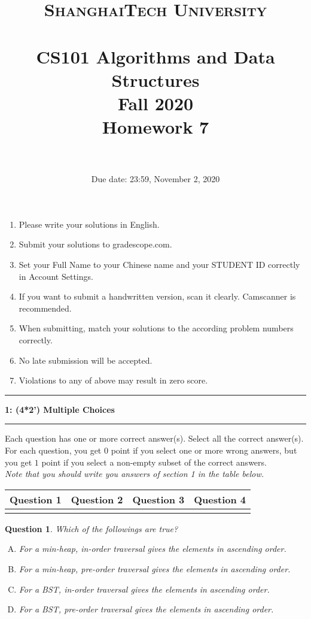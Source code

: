 \documentclass[10.5pt]{article}
\title{
	\normalfont \normalsize
	\textsc{ShanghaiTech University} \\ [25pt]
	\horrule{0.5pt} \\[0.4cm] %
	\huge CS101 Algorithms and Data Structures\\ %
	\LARGE Fall 2020\\
	\LARGE Homework 7\\
	\horrule{2pt} \\[0.5cm] %
}
\author{}
\date{Due date: 23:59, November 2, 2020}
\newcommand\question[2]{\vspace{.25in}\hrule\textbf{#1: #2}\vspace{.5em}\hrule\vspace{.10in}}
\newtheorem{Q}{Question}
\begin{document}
	\maketitle
	\thispagestyle{firstpage}
	\vspace{3ex}
	
	\begin{enumerate}
		\item Please write your solutions in English. 
		
		\item Submit your solutions to gradescope.com.  
		
		\item Set your Full Name to your Chinese name and your STUDENT ID correctly in Account Settings. 
		
		\item If you want to submit a handwritten version, scan it clearly. Camscanner is recommended. 
		
		\item When submitting, match your solutions to the according problem numbers correctly. 
		
		\item No late submission will be accepted.
		
		\item Violations to any of above may result in zero score. 
	\end{enumerate}
	\newpage
	
\question{1}{(4*2') Multiple Choices}

Each question has one or more correct answer(s). Select all the correct answer(s). For each question, you get $0$ point if you select one or more wrong answers, but you get $1$ point if you select a non-empty subset of the correct answers.\\
\textit{Note that you should write you answers of section 1 in the table below.}
\begin{table}[htbp]
	\begin{tabular}{|p{2cm}|p{2cm}|p{2cm}|p{2cm}|}
		\hline 
		Question 1 & Question 2 & Question 3 & Question 4  \\ 
		\hline 
		&  &  &  \\ 
		\hline 
	\end{tabular} 
\end{table}

\begin{Q}
	Which of the followings are true? 
	\begin{enumerate}[(A)]
		\item For a min-heap, in-order traversal gives the elements in ascending order.
		\item For a min-heap, pre-order traversal gives the elements in ascending order.
		\item For a BST, in-order traversal gives the elements in ascending order.
		\item For a BST, pre-order traversal gives the elements in ascending order.
	\end{enumerate}
\end{Q}
\end{document}
